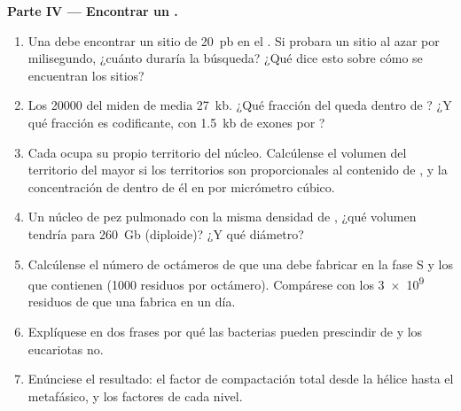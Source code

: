 \begin{problem}
\medskip
\noindent\textbf{Parte IV --- Encontrar un .}
\begin{enumerate}[resume]
  \item Una  debe encontrar un sitio de \qty{20}{pb} en el .
        Si probara un sitio al azar por milisegundo, ¿cuánto duraría la
        búsqueda? ¿Qué dice esto sobre cómo se encuentran los sitios?
  \item Los \qty{20000}{}  del  miden de media \qty{27}{kb}.
        ¿Qué fracción del  queda dentro de ? ¿Y qué fracción es
        codificante, con \qty{1.5}{kb} de exones por ?
  \item Cada  ocupa su propio territorio del núcleo. Calcúlense el
        volumen del territorio del  mayor si los territorios son
        proporcionales al contenido de , y la concentración de 
        dentro de él en  por micrómetro cúbico.
  \item Un núcleo de pez pulmonado con la misma densidad de , ¿qué
        volumen tendría para \qty{260}{Gb} (diploide)? ¿Y qué diámetro?
  \item Calcúlense el número de octámeros de  que una  debe
        fabricar en la fase S y los  que contienen (\qty{1000}{}
        residuos por octámero). Compárese con los \qty{3e9}{} residuos de
         que una  fabrica en un día.
  \item Explíquese en dos frases por qué las bacterias pueden prescindir de
         y los eucariotas no.
  \item Enúnciese el resultado: el factor de compactación total desde la
        hélice hasta el  metafásico, y los factores de cada nivel.
\end{enumerate}
\end{problem}
